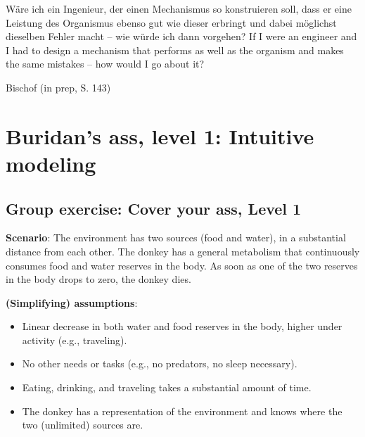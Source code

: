\documentclass[
  letterpaper,
  DIV=11,
  numbers=noendperiod]{scrartcl}
\providecommand{\tightlist}{%
  \setlength{\itemsep}{0pt}\setlength{\parskip}{0pt}}\usepackage{longtable,booktabs,array}
\begin{document}
\begin{tcolorbox}[enhanced jigsaw, coltitle=black, opacityback=0, toprule=.15mm, colback=white, colframe=quarto-callout-note-color-frame, bottomtitle=1mm, breakable, leftrule=.75mm, left=2mm, opacitybacktitle=0.6, title=\textcolor{quarto-callout-note-color}{\faInfo}\hspace{0.5em}{Note}, bottomrule=.15mm, toptitle=1mm, titlerule=0mm, colbacktitle=quarto-callout-note-color!10!white, rightrule=.15mm, arc=.35mm]

Wäre ich ein Ingenieur, der einen Mechanismus so konstruieren soll, dass
er eine Leistung des Organismus ebenso gut wie dieser erbringt und dabei
möglichst dieselben Fehler macht -- wie würde ich dann vorgehen? {If I
were an engineer and I had to design a mechanism that performs as well
as the organism and makes the same mistakes -- how would I go about it?}

\end{tcolorbox}

Bischof (in prep, S. 143)

\hypertarget{buridans-ass-level-1-intuitive-modeling}{%
\section{Buridan's ass, level 1: Intuitive
modeling}\label{buridans-ass-level-1-intuitive-modeling}}

\hypertarget{fa-people-group-size1x-group-exercise-cover-your-ass-level-1}{%
\subsection{\texorpdfstring{{ Group exercise: Cover
your ass, Level
1}}{ Group exercise: Cover your ass, Level 1}}\label{fa-people-group-size1x-group-exercise-cover-your-ass-level-1}}

\textbf{Scenario}: The environment has two sources (food and water), in
a substantial distance from each other. The donkey has a general
metabolism that continuously consumes food and water reserves in the
body. As soon as one of the two reserves in the body drops to zero, the
donkey dies.

\textbf{(Simplifying) assumptions}:

\begin{itemize}
\tightlist
\item
  Linear decrease in both water and food reserves in the body, higher
  under activity (e.g., traveling).
\item
  No other needs or tasks (e.g., no predators, no sleep necessary).
\item
  Eating, drinking, and traveling takes a substantial amount of time.
\item
  The donkey has a representation of the environment and knows where the
  two (unlimited) sources are.
\end{itemize}
\end{document}
